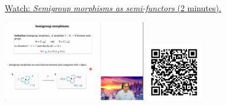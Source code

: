 
\begin{minipage}{10cm}
    \href{https://act4e-spring21.netlify.app/videos/spring2021-functors:semi-and-fun:ex-semigroup-semifun.html}{Watch: \emph{Semigroup morphisms as semi-functors} (2 minutes).}
        
    \href{https://act4e-spring21.netlify.app/videos/spring2021-functors:semi-and-fun:ex-semigroup-semifun.html}{\includegraphics[height=3.5cm]{spring2021-functors:semi-and-fun:ex-semigroup-semifun/thumbnails.jpg}}
    \href{https://act4e-spring21.netlify.app/videos/spring2021-functors:semi-and-fun:ex-semigroup-semifun.html}{\includegraphics[height=2.5cm]{spring2021-functors:semi-and-fun:ex-semigroup-semifun/qrcode.png}}
\end{minipage}
